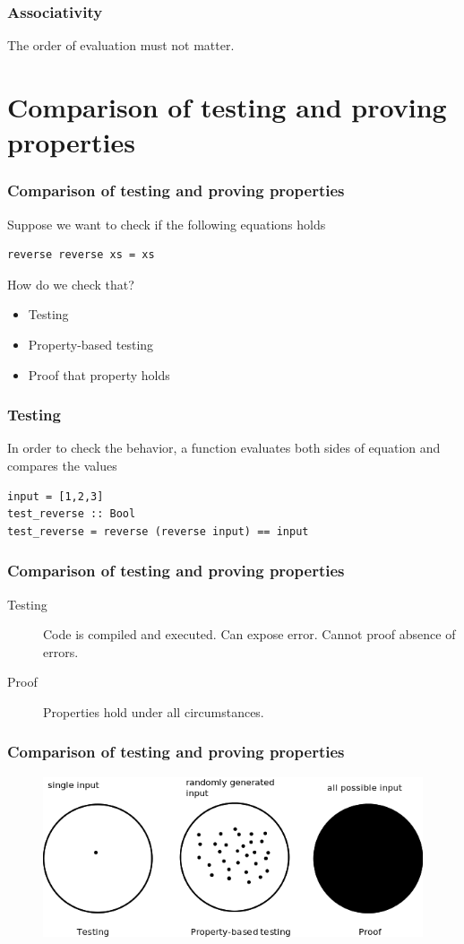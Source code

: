 \documentclass{beamer}
\begin{document}
\begin{frame}[fragile]
\frametitle{Associativity}
The order of evaluation must not matter.

\end{frame}


\section{Comparison of testing and proving properties}

\begin{frame}[fragile]
  \frametitle{Comparison of testing and proving properties}
  Suppose we want to check if the following equations holds
\begin{verbatim}
reverse reverse xs = xs
\end{verbatim}
How do we check that?
\begin{itemize}
\item Testing
\item Property-based testing
\item Proof that property holds
\end{itemize}

\end{frame}

\begin{frame}[fragile]
  \frametitle{Testing}
 In order to check the behavior, a function evaluates both sides of equation and compares the values
\begin{verbatim}
input = [1,2,3]
test_reverse :: Bool
test_reverse = reverse (reverse input) == input
\end{verbatim}
\end{frame}

\begin{frame}
  \frametitle{Comparison of testing and proving properties}
  \begin{description}
  \item[Testing] Code is compiled and executed. Can expose error. Cannot proof absence of errors. 
  \item[Proof] Properties hold under all circumstances.
\end{description}
\end{frame}

\begin{frame}
  \frametitle{Comparison of testing and proving properties}
\begin{figure}
  \centering
     \includegraphics[width=1\textwidth]{testing}
\end{figure}
\end{frame}
\end{document}
